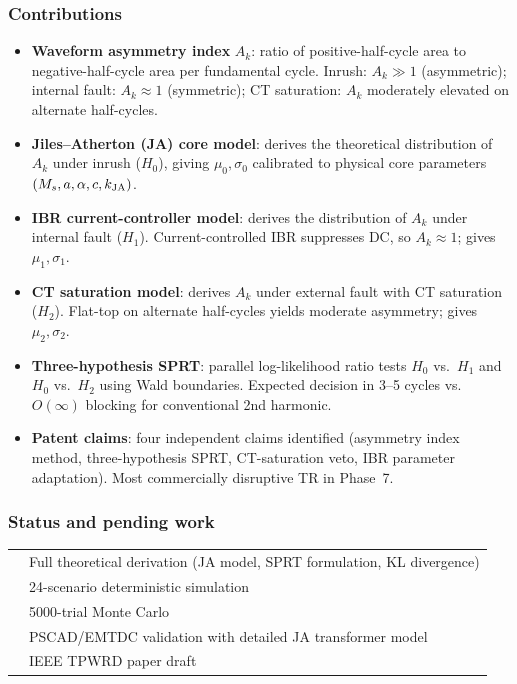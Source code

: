\documentclass[12pt,a4paper]{article}
\newcommand{\cmark}{\ding{51}}
\newcommand{\pmark}{\ding{118}}   %
\begin{document}
\subsubsection{Contributions}
\begin{itemize}
  \item \textbf{Waveform asymmetry index} $A_k$: ratio of positive-half-cycle
    area to negative-half-cycle area per fundamental cycle.  Inrush:
    $A_k \gg 1$ (asymmetric); internal fault: $A_k \approx 1$ (symmetric);
    CT saturation: $A_k$ moderately elevated on alternate half-cycles.
  \item \textbf{Jiles--Atherton (JA) core model}: derives the theoretical
    distribution of $A_k$ under inrush ($H_0$), giving $\mu_0, \sigma_0$
    calibrated to physical core parameters $(M_s, a, \alpha, c, k_{\rm JA})$.
  \item \textbf{IBR current-controller model}: derives the distribution
    of $A_k$ under internal fault ($H_1$).  Current-controlled IBR suppresses DC,
    so $A_k \approx 1$; gives $\mu_1, \sigma_1$.
  \item \textbf{CT saturation model}: derives $A_k$ under external fault
    with CT saturation ($H_2$).  Flat-top on alternate half-cycles yields
    moderate asymmetry; gives $\mu_2, \sigma_2$.
  \item \textbf{Three-hypothesis SPRT}: parallel log-likelihood ratio tests
    $H_0$ vs.\ $H_1$ and $H_0$ vs.\ $H_2$ using Wald boundaries.
    Expected decision in 3--5 cycles vs.\ $O(\infty)$ blocking for conventional
    2nd harmonic.
  \item \textbf{Patent claims}: four independent claims identified (asymmetry
    index method, three-hypothesis SPRT, CT-saturation veto, IBR parameter
    adaptation).  Most commercially disruptive TR in Phase~7.
\end{itemize}

\subsubsection{Status and pending work}
\begin{tabular}{ll}
  \cmark & Full theoretical derivation (JA model, SPRT formulation, KL divergence) \\
  \pmark & 24-scenario deterministic simulation \\
  \pmark & 5000-trial Monte Carlo \\
  \pmark & PSCAD/EMTDC validation with detailed JA transformer model \\
  \pmark & IEEE TPWRD paper draft \\
\end{tabular}
\end{document}
